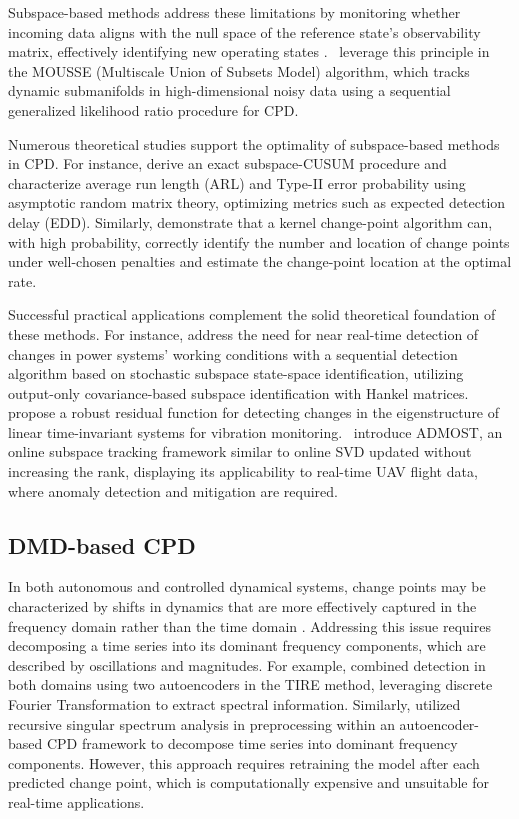Subspace-based methods address these limitations by monitoring whether incoming data aligns with the null space of the reference state's observability matrix, effectively identifying new operating states \citep{Dohler2013, Ye2023}.\ \citet{Xie2013} leverage this principle in the MOUSSE (Multiscale Union of Subsets Model) algorithm, which tracks dynamic submanifolds in high-dimensional noisy data using a sequential generalized likelihood ratio procedure for CPD\@.

Numerous theoretical studies support the optimality of subspace-based methods in CPD\@. For instance, \citet{Ye2023} derive an exact subspace-CUSUM procedure and characterize average run length (ARL) and Type-II error probability using asymptotic random matrix theory, optimizing metrics such as expected detection delay (EDD). Similarly, \citet{Garreau2018} demonstrate that a kernel change-point algorithm can, with high probability, correctly identify the number and location of change points under well-chosen penalties and estimate the change-point location at the optimal rate.

Successful practical applications complement the solid theoretical foundation of these methods. For instance, \citet{Hosur2019} address the need for near real-time detection of changes in power systems' working conditions with a sequential detection algorithm based on stochastic subspace state-space identification, utilizing output-only covariance-based subspace identification with Hankel matrices.\ \citet{Dohler2013} propose a robust residual function for detecting changes in the eigenstructure of linear time-invariant systems for vibration monitoring.\ \citet{He2019} introduce ADMOST, an online subspace tracking framework similar to online SVD updated without increasing the rank, displaying its applicability to real-time UAV flight data, where anomaly detection and mitigation are required.

\subsection{DMD-based CPD}
In both autonomous and controlled dynamical systems, change points may be characterized by shifts in dynamics that are more effectively captured in the frequency domain rather than the time domain \citep{DeRyck2021, Gupta2022}. Addressing this issue requires decomposing a time series into its dominant frequency components, which are described by oscillations and magnitudes. For example, \citet{DeRyck2021} combined detection in both domains using two autoencoders in the TIRE method, leveraging discrete Fourier Transformation to extract spectral information. Similarly, \citet{Gupta2022} utilized recursive singular spectrum analysis in preprocessing within an autoencoder-based CPD framework to decompose time series into dominant frequency components. However, this approach requires retraining the model after each predicted change point, which is computationally expensive and unsuitable for real-time applications.

